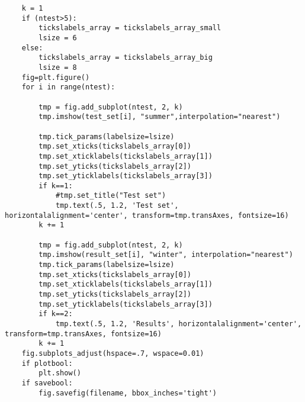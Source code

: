 \documentclass[letterpaper,twocolumn,10pt]{article}
\begin{document}
\begin{lstlisting}
    k = 1
    if (ntest>5):
        tickslabels_array = tickslabels_array_small
        lsize = 6
    else:
        tickslabels_array = tickslabels_array_big
        lsize = 8
    fig=plt.figure()
    for i in range(ntest):

        tmp = fig.add_subplot(ntest, 2, k)
        tmp.imshow(test_set[i], "summer",interpolation="nearest")

        tmp.tick_params(labelsize=lsize)
        tmp.set_xticks(tickslabels_array[0])
        tmp.set_xticklabels(tickslabels_array[1])
        tmp.set_yticks(tickslabels_array[2])
        tmp.set_yticklabels(tickslabels_array[3])
        if k==1:
            #tmp.set_title("Test set")
            tmp.text(.5, 1.2, 'Test set', horizontalalignment='center', transform=tmp.transAxes, fontsize=16)
        k += 1

        tmp = fig.add_subplot(ntest, 2, k)
        tmp.imshow(result_set[i], "winter", interpolation="nearest")
        tmp.tick_params(labelsize=lsize)
        tmp.set_xticks(tickslabels_array[0])
        tmp.set_xticklabels(tickslabels_array[1])
        tmp.set_yticks(tickslabels_array[2])
        tmp.set_yticklabels(tickslabels_array[3])
        if k==2:
            tmp.text(.5, 1.2, 'Results', horizontalalignment='center', transform=tmp.transAxes, fontsize=16)
        k += 1
    fig.subplots_adjust(hspace=.7, wspace=0.01)
    if plotbool:
        plt.show()
    if savebool:
        fig.savefig(filename, bbox_inches='tight')

\end{lstlisting}

\clearpage
\end{document}
